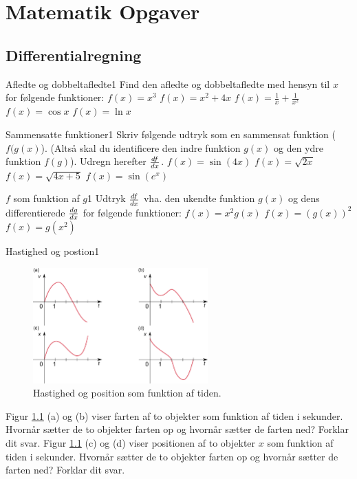 \chapter{Matematik Opgaver}

\section*{Differentialregning}
\begin{opgave}{Afledte og dobbeltafledte}{1}
Find den afledte og dobbeltafledte med hensyn til $x$ for følgende funktioner:
\opg $f(x) = x^3$
\opg $f(x) = x^2 + 4x$
\opg $f(x) = \frac{1}{x} + \frac{1}{x^2}$
\opg $f(x) = \cos x$
\opg $f(x) = \ln x$
\end{opgave}

\begin{opgave}{Sammensatte funktioner}{1}
Skriv følgende udtryk som en sammensat funktion ($f(g(x)$). (Altså skal du identificere den indre funktion $g(x)$ og den ydre funktion $f(g)$). Udregn herefter ${d{f} \over d{x}}$. 
\opg $f(x) = \sin (4x)$
\opg $f(x) = \sqrt{2x}$
\opg $f(x) = \sqrt{4x+5}$
\opg $f(x) = \sin(e^x)$
\end{opgave}

\begin{opgave}{$f$ som funktion af $g$}{1}
	Udtryk ${d{f} \over d{x}}$ vha. den ukendte funktion $g(x)$ og dens
	differentierede ${d{g} \over d{x}}$ for følgende funktioner:
	\opg $f(x) = x^2 g(x)$
	\opg $f(x) = \left(g(x)\right)^2$
	\opg $f(x) = g(x^2)$
\end{opgave}

\begin{opgave}{Hastighed og postion}{1}
\begin{figure}[h!]
  \centering
  \includegraphics[width=0.6\textwidth]{matematik/vx_grafer.png}
  \caption{Hastighed og position som funktion af tiden.}
  \label{fig:vx_grafer}
\end{figure}
\opg Figur \ref{fig:vx_grafer} (a) og (b) viser farten af to objekter som funktion af tiden i sekunder. Hvornår sætter de to objekter farten op og hvornår sætter de farten ned? Forklar dit svar.
\opg Figur \ref{fig:vx_grafer} (c) og (d) viser positionen af to objekter $x$ som funktion af tiden i sekunder. Hvornår sætter de to objekter farten op og hvornår sætter de farten ned? Forklar dit svar.
\end{opgave}

